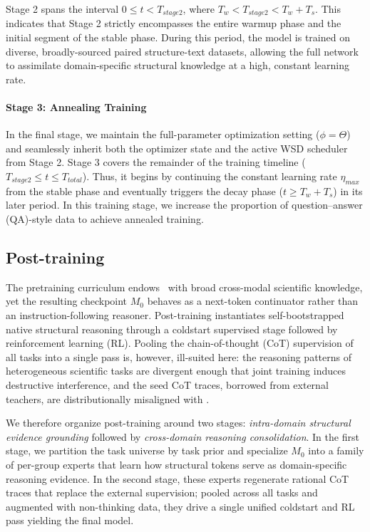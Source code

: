 Stage 2 spans the interval $0 \le t < T_{stage2}$, where $T_{w} < T_{stage2} < T_{w} + T_{s}$. This indicates that Stage 2 strictly encompasses the entire warmup phase and the initial segment of the stable phase. During this period, the model is trained on diverse, broadly-sourced paired structure-text datasets, allowing the full network to assimilate domain-specific structural knowledge at a high, constant learning rate.

\paragraph{Stage 3: Annealing Training} 
In the final stage, we maintain the full-parameter optimization setting ($\phi = \Theta$) and seamlessly inherit both the optimizer state and the active WSD scheduler from Stage 2. Stage 3 covers the remainder of the training timeline ($T_{stage2} \le t \le T_{total}$). Thus, it begins by continuing the constant learning rate $\eta_{max}$ from the stable phase and eventually triggers the decay phase ($t \ge T_{w} + T_{s}$) in its later period. 
In this training stage, we increase the proportion of question--answer (QA)-style data to achieve annealed training. 
\subsection{Post-training}

The pretraining curriculum endows \projName~with broad cross-modal scientific knowledge, yet the resulting checkpoint $M_0$ behaves as a next-token continuator rather than an instruction-following reasoner. Post-training instantiates self-bootstrapped native structural reasoning through a coldstart supervised stage followed by reinforcement learning (RL). Pooling the chain-of-thought (CoT) supervision of all tasks into a single pass is, however, ill-suited here: the reasoning patterns of heterogeneous scientific tasks are divergent enough that joint training induces destructive interference, and the seed CoT traces, borrowed from external teachers, are distributionally misaligned with \projName.

We therefore organize post-training around two stages: \emph{intra-domain structural evidence grounding} followed by \emph{cross-domain reasoning consolidation}. 
In the first stage, we partition the task universe by task prior and specialize $M_0$ into a family of per-group experts that learn how structural tokens serve as domain-specific reasoning evidence. In the second stage, these experts regenerate rational CoT traces that replace the external supervision; pooled across all tasks and augmented with non-thinking data, they drive a single unified coldstart and RL pass yielding the final model. 


